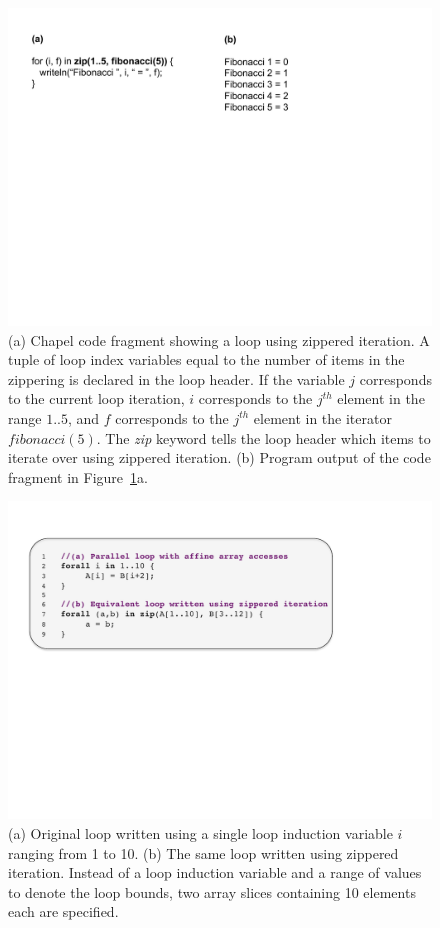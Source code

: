 \begin{figure}
	\begin{center}
	\includegraphics[scale=0.50]{./Figures/zippered_iteration}
	\caption{(a) Chapel code fragment showing a loop using zippered iteration. A tuple of loop index variables equal to the number of items in the zippering is declared in the loop header. If the variable $j$ corresponds to the current loop iteration, $i$ corresponds to the $j^{th}$ element in the range $1..5$, and $f$ corresponds to the $j^{th}$ element in the iterator $fibonacci(5)$. The \textit{zip} keyword tells the loop header which items to iterate over using zippered iteration. (b) Program output of the code fragment in Figure~\ref{zippered_iteration}a.}
	\label{zippered_iteration}
	\end{center}
\end{figure}

\begin{figure}
	\begin{center}
	\includegraphics[scale=0.50]{./Figures/affine_loop}
	\caption{(a) Original loop written using a single loop induction variable $i$ ranging from 1 to 10. (b) The same loop written using zippered iteration. Instead of a loop induction variable and a range of values to denote the loop bounds, two array slices containing 10 elements each are specified.}
	\label{affine_loop}
	\end{center}
\end{figure}